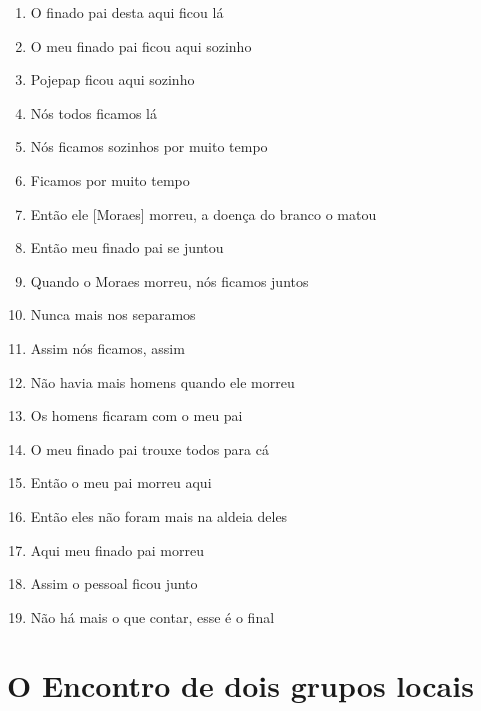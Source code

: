 \begin{enumerate}
 \item O finado pai desta aqui ficou lá

 \item O meu finado pai ficou aqui sozinho

 \item Pojepap ficou aqui sozinho

 \item Nós todos ficamos lá

 \item Nós ficamos sozinhos por muito tempo

 \item Ficamos por muito tempo

 \begin{center}\end{center}

 \item Então ele {[}Moraes{]} morreu, a doença do branco o matou

 \item Então meu finado pai se juntou

 \item Quando o Moraes morreu, nós ficamos juntos

 \item Nunca mais nos separamos

 \item Assim nós ficamos, assim

 \item Não havia mais homens quando ele morreu

 \item Os homens ficaram com o meu pai

 \item O meu finado pai trouxe todos para cá

 \item Então o meu pai morreu aqui

 \item Então eles não foram mais na aldeia deles

 \item Aqui meu finado pai morreu

 \item Assim o pessoal ficou junto

 \item Não há mais o que contar, esse é o final
\end{enumerate}


 \chapter{O Encontro de dois grupos locais}

